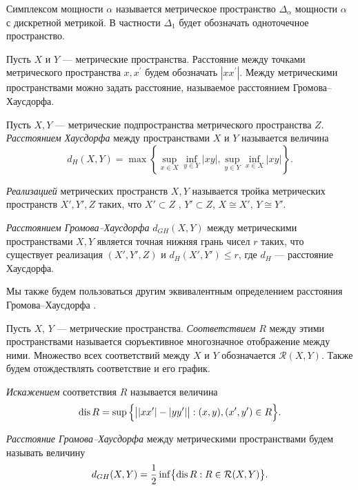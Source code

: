 \begin{definition}[Симплекс]
  Симплексом мощности \( \alpha \) называется метрическое
  пространство \( \Delta _
  \alpha  \) мощности \( \alpha  \) с дискретной метрикой. В
  частности \( \Delta _1 \) будет обозначать одноточечное пространство.
\end{definition}
Пусть $X$ и $Y$ ---
метрические пространства. Расстояние между точками метрического
пространства \( x, x^\prime \) будем обозначать \( | xx^\prime | \).
Между метрическими пространствами можно задать расстояние, называемое
расстоянием Громова--Хаусдорфа.
\begin{definition}
  Пусть \( X,Y \) --- метрические подпространства метрического
  пространства \( Z \). \emph{Расстоянием Хаусдорфа} между
  пространствами \( X \) и \( Y \) называется величина
  \[
    d_H(X,Y) = \max \left\{\sup_{x\in X}\inf_{y\in Y} | xy |,
    \sup_{y\in Y}\inf_{x\in X} | xy |\right\}.
  \]
\end{definition}
\begin{definition}
  \emph{Реализацией} метрических пространств \( X, Y \) называется
  тройка метрических пространств \( X', Y', Z \) таких, что \( X'
  \subset Z \) , \( Y' \subset Z \), \( X \cong X' \), \( Y \cong Y' \).

  \emph{Расстоянием Громова--Хаусдорфа}  $d_{GH}(X,Y)$ между метрическими
  пространствами $X, Y$ является точная нижняя  грань чисел $r$
  таких, что существует реализация $(X',Y',Z)$ и $d_H(X', Y')  \le
  r$, где $d_H$ --- расстояние Хаусдорфа.
\end{definition}
Мы также будем пользоваться другим эквивалентным определением
расстояния Громова--Хаусдорфа \cite{Lectures}.
\begin{definition}[Соответствие]
  \label{def:Sootvet}
  Пусть $X$, $Y$ --- метрические пространства. \emph{Соответствием}
  $R$ между этими пространствами
  называется сюръективное многозначное отображение между ними.
  Множество всех соответствий между $X$ и $Y$ обозначается
  $\mathcal{R}(X,Y)$. Также будем отождествлять соответствие и его
  график.

  \emph{Искажением} соответствия \( R \) называется величина
  \[
    \operatorname{dis}{R} = \sup{\Bigl\{ \big| |xx'| - |yy'| \big| : (x, y), (x',
    y') \in R\Bigr\}}.
  \]
\end{definition}
\begin{definition}
  \emph{Расстояние Громова--Хаусдорфа} между метрическими
  пространствами будем называть величину
  \[
    d_{GH}(X,Y) = \frac{1}{2}\inf \bigl\{\operatorname{dis}{R} : R \in
    \mathcal{R}(X,Y)\bigr\}.
  \]
\end{definition}
